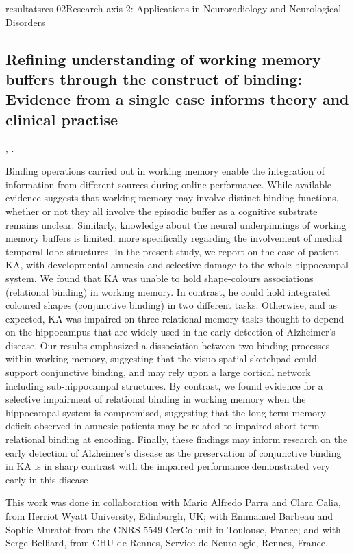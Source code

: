 \documentclass{ra2018}
\begin{document}
\begin{module}{resultats}{res-02}{Research axis 2: Applications in Neuroradiology and Neurological Disorders}
\subsection{Refining understanding of working memory buffers through the construct of binding: Evidence from a single case informs theory and clinical practise}
\begin{participants}
      ,
      .
\end{participants}
Binding operations carried out in working memory enable the integration of information from different sources during online performance. While available evidence suggests that working memory may involve distinct binding functions, whether or not they all involve the episodic buffer as a cognitive substrate remains unclear. Similarly, knowledge about the neural underpinnings of working memory buffers is limited, more specifically regarding the involvement of medial temporal lobe structures. In the present study, we report on the case of patient KA, with developmental amnesia and selective damage to the whole hippocampal system. We found that KA was unable to hold shape-colours associations (relational binding) in working memory. In contrast, he could hold integrated coloured shapes (conjunctive binding) in two different tasks. Otherwise, and as expected, KA was impaired on three relational memory tasks thought to depend on the hippocampus that are widely used in the early detection of Alzheimer's disease. Our results emphasized a dissociation between two binding processes within working memory, suggesting that the visuo-spatial sketchpad could support conjunctive binding, and may rely upon a large cortical network including sub-hippocampal structures. By contrast, we found evidence for a selective impairment of relational binding in working memory when the hippocampal system is compromised, suggesting that the long-term memory deficit observed in amnesic patients may be related to impaired short-term relational binding at encoding. Finally, these findings may inform research on the early detection of Alzheimer's disease as the preservation of conjunctive binding in KA is in sharp contrast with the impaired performance demonstrated very early in this disease~\cite{jonin:inserm-01916090}.

This work was done in collaboration with Mario Alfredo Parra and Clara Calia, from Herriot Wyatt University, Edinburgh, UK; with Emmanuel Barbeau and Sophie Muratot from the CNRS 5549 CerCo unit in Toulouse, France; and with Serge Belliard, from CHU de Rennes, Service de Neurologie, Rennes, France.


\end{module}
\end{document}
